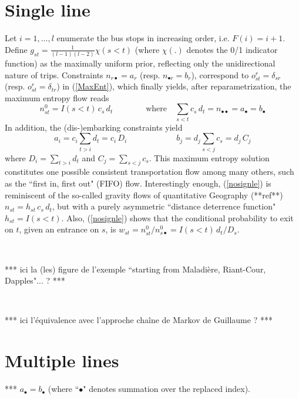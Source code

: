 \documentclass{bmcart}
\begin{document}
\section{Single line}
\label{Single line}
Let  $i=1,\ldots, l$ enumerate the bus stops in increasing order,  i.e. $F(i)=i+1$. Define $g_{st}=\frac{1}{(l-1)(l-2)}\chi(s<t)$ (where $\chi(.)$ denotes the 0/1  indicator function) as the maximally uniform prior, reflecting only the unidirectional nature of trips. 
Constraints $n_{r\bullet}=a_r$ (resp. $n_{\bullet r}=b_r$), correspond to $o^r_{st}=
\delta_{sr}$ (resp. $o^r_{st}=\delta_{tr}$) in (\ref{MaxEnt}), which finally yields, after reparametrization, the maximum entropy flow reads
\begin{equation}
\label{nosignle}
n^0_{st}=I(s<t)\, c_s\, d_t \qquad\qquad\mbox{where}\quad \sum_{s<t}c_s\, d_t=n_{\bullet\bullet}=a_{\bullet}=b_\bullet
\end{equation}
In addition, the (dis-)embarking constraints  yield
\begin{equation}
\label{(dis embarking constraints}
a_i=c_i \sum_{t>i}d_t=c_i\, D_i 
\qquad\qquad\qquad
b_j=d_j\sum_{s<j}c_s=d_j \, C_j  
\end{equation}
where $D_i=\sum_{t>i}d_t$ and $C_j=\sum_{s<j}c_s$. This maximum entropy solution constitutes one possible consistent transportation flow among many others, such as the ``first in, first out" (FIFO) flow. Interestingly enough, (\ref{nosignle}) is reminiscent of the so-called gravity flows of quantitative Geography (**ref**) $n_{st}=h_{st}\, c_s\, d_t $, but with a purely asymmetric ``distance deterrence function" $h_{st}=I(s<t)$.  Also, 
(\ref{nosignle}) shows that  the conditional probability to exit on $t$, given an entrance on $s$, is $w_{st}=n^0_{st}/n^0_{s\bullet}=I(s<t)\, d_t/D_s$. 


\

*** ici la (les) figure de l'exemple  ``starting from Maladière, Riant-Cour, Dapples"... ? ***

\


*** ici l'équivalence avec l'approche chaîne de Markov de Guillaume ? ***
 


\section{Multiple lines} 

*** $a_{\bullet}=b_{\bullet}$ (where ``$\bullet$" denotes summation over the replaced index). 
 
\end{document}
